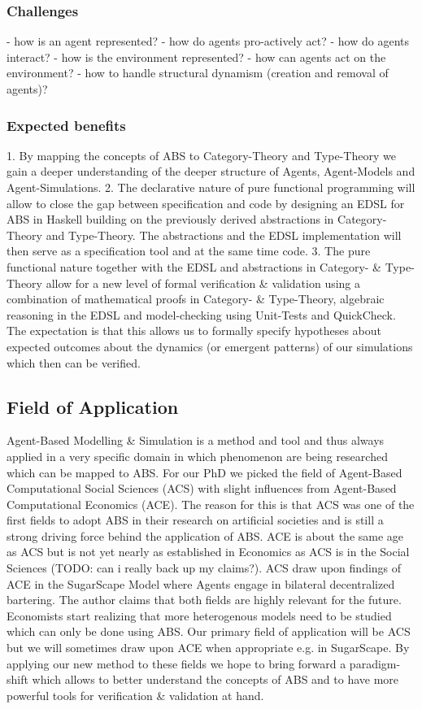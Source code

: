 \subsubsection{Challenges}
- how is an agent represented?
- how do agents pro-actively act?
- how do agents interact?
- how is the environment represented?
- how can agents act on the environment?
- how to handle structural dynamism (creation and removal of agents)?

\subsubsection{Expected benefits}
1. By mapping the concepts of ABS to Category-Theory and Type-Theory we gain a deeper understanding of the deeper structure of Agents, Agent-Models and Agent-Simulations.
2. The declarative nature of pure functional programming will allow to close the gap between specification and code by designing an EDSL for ABS in Haskell building on the previously derived abstractions in Category-Theory and Type-Theory. The abstractions and the EDSL implementation will then serve as a specification tool and at the same time code.
3. The pure functional nature together with the EDSL and abstractions in Category- \& Type-Theory allow for a new level of formal verification \& validation using a combination of mathematical proofs in Category- \& Type-Theory, algebraic reasoning in the EDSL and model-checking using Unit-Tests and QuickCheck. The expectation is that this allows us to formally specify hypotheses about expected outcomes about the dynamics (or emergent patterns) of our simulations which then can be verified.

\subsection{Field of Application}
Agent-Based Modelling \& Simulation is a method and tool and thus always applied in a very specific domain in which phenomenon are being researched which can be mapped to ABS. For our PhD we picked the field of Agent-Based Computational Social Sciences (ACS) with slight influences from Agent-Based Computational Economics (ACE). The reason for this is that ACS was one of the first fields to adopt ABS in their research on artificial societies and is still a strong driving force behind the application of ABS. ACE is about the same age as ACS but is not yet nearly as established in Economics as ACS is in the Social Sciences (TODO: can i really back up my claims?). ACS draw upon findings of ACE in the SugarScape Model where Agents engage in bilateral decentralized bartering. The author claims that both fields are highly relevant for the future. Economists start realizing that more heterogenous models need to be studied which can only be done using ABS.
Our primary field of application will be ACS but we will sometimes draw upon ACE when appropriate e.g. in SugarScape. By applying our new method to these fields we hope to bring forward a paradigm-shift which allows to better understand the concepts of ABS and to have more powerful tools for verification \& validation at hand.

